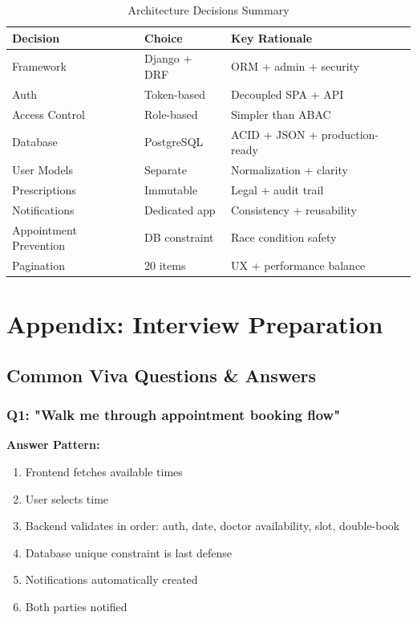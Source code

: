 \documentclass[11pt,a4paper,twoside]{report}
\begin{document}
\begin{table}[H]
\centering
\small
\begin{tabular}{|l|l|l|}
\hline
\textbf{Decision} & \textbf{Choice} & \textbf{Key Rationale} \\
\hline
Framework & Django + DRF & ORM + admin + security \\
\hline
Auth & Token-based & Decoupled SPA + API \\
\hline
Access Control & Role-based & Simpler than ABAC \\
\hline
Database & PostgreSQL & ACID + JSON + production-ready \\
\hline
User Models & Separate & Normalization + clarity \\
\hline
Prescriptions & Immutable & Legal + audit trail \\
\hline
Notifications & Dedicated app & Consistency + reusability \\
\hline
Appointment Prevention & DB constraint & Race condition safety \\
\hline
Pagination & 20 items & UX + performance balance \\
\hline
\end{tabular}
\caption{Architecture Decisions Summary}
\end{table}

\newpage

\chapter*{Appendix: Interview Preparation}

\section*{Common Viva Questions \& Answers}

\subsection*{Q1: "Walk me through appointment booking flow"}

\textbf{Answer Pattern:}
\begin{enumerate}
    \item Frontend fetches available times
    \item User selects time
    \item Backend validates in order: auth, date, doctor availability, slot, double-book
    \item Database unique constraint is last defense
    \item Notifications automatically created
    \item Both parties notified
\end{enumerate}
\end{document}
